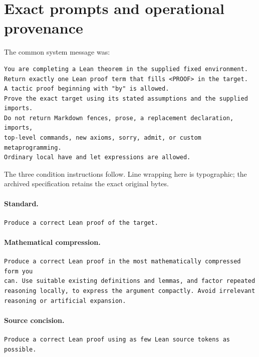 \documentclass[11pt]{article}
\begin{document}
\section{Exact prompts and operational provenance}
\small
\label{app:exact-prompts}

The common system message was:
\begin{verbatim}
You are completing a Lean theorem in the supplied fixed environment.
Return exactly one Lean proof term that fills <PROOF> in the target.
A tactic proof beginning with "by" is allowed.
Prove the exact target using its stated assumptions and the supplied imports.
Do not return Markdown fences, prose, a replacement declaration, imports,
top-level commands, new axioms, sorry, admit, or custom metaprogramming.
Ordinary local have and let expressions are allowed.
\end{verbatim}
The three condition instructions follow. Line wrapping here is typographic; the archived specification retains the exact original bytes.

\paragraph{Standard.}
\begin{verbatim}
Produce a correct Lean proof of the target.
\end{verbatim}
\paragraph{Mathematical compression.}
\begin{verbatim}
Produce a correct Lean proof in the most mathematically compressed form you
can. Use suitable existing definitions and lemmas, and factor repeated
reasoning locally, to express the argument compactly. Avoid irrelevant
reasoning or artificial expansion.
\end{verbatim}
\paragraph{Source concision.}
\begin{verbatim}
Produce a correct Lean proof using as few Lean source tokens as possible.
\end{verbatim}
\end{document}
